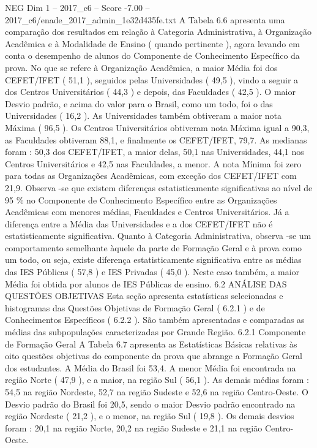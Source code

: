 \begin{textsample}{NEG Dim 1 – 2017\_c6 – Score -7.00 – 2017\_c6/enade\_2017\_admin\_1e32d435fe.txt}
A Tabela 6.6 apresenta uma comparação dos resultados em relação à Categoria Administrativa, à Organização Acadêmica e à Modalidade de Ensino ( quando pertinente ), agora levando em conta o desempenho de alunos do Componente de Conhecimento Específico da prova.
No que se refere à Organização Acadêmica, a maior Média foi dos CEFET/IFET ( 51,1 ), seguidos pelas Universidades ( 49,5 ), vindo a seguir a dos Centros Universitários ( 44,3 ) e depois, das Faculdades ( 42,5 ).
O maior Desvio padrão, e acima do valor para o Brasil, como um todo, foi o das Universidades ( 16,2 ).
As Universidades também obtiveram a maior nota Máxima ( 96,5 ).
Os Centros Universitários obtiveram nota Máxima igual a 90,3, as Faculdades obtiveram 88,1, e finalmente os CEFET/IFET, 79,7.
As medianas foram : 50,3 dos CEFET/IFET, a maior delas, 50,1 nas Universidades, 44,1 nos Centros Universitários e 42,5 nas Faculdades, a menor.
A nota Mínima foi zero para todas as Organizações Acadêmicas, com exceção dos CEFET/IFET com 21,9.
Observa -se que existem diferenças estatisticamente significativas ao nível de 95 \% no Componente de Conhecimento Específico entre as Organizações Acadêmicas com menores médias, Faculdades e Centros Universitários.
Já a diferença entre a Média das Universidades e a dos CEFET/IFET não é estatisticamente significativa.
Quanto à Categoria Administrativa, observa -se um comportamento semelhante àquele da parte de Formação Geral e à prova como um todo, ou seja, existe diferença estatisticamente significativa entre as médias das IES Públicas ( 57,8 ) e IES Privadas ( 45,0 ).
Neste caso também, a maior Média foi obtida por alunos de IES Públicas de ensino. 6.2 ANÁLISE DAS QUESTÕES OBJETIVAS Esta seção apresenta estatísticas selecionadas e histogramas das Questões Objetivas de Formação Geral ( 6.2.1 ) e de Conhecimentos Específicos ( 6.2.2 ).
São também apresentadas e comparadas as médias das subpopulações caracterizadas por Grande Região. 6.2.1 Componente de Formação Geral A Tabela 6.7 apresenta as Estatísticas Básicas relativas às oito questões objetivas do componente da prova que abrange a Formação Geral dos estudantes.
A Média do Brasil foi 53,4.
A menor Média foi encontrada na região Norte ( 47,9 ), e a maior, na região Sul ( 56,1 ).
As demais médias foram : 54,5 na região Nordeste, 52,7 na região Sudeste e 52,6 na região Centro-Oeste.
O Desvio padrão do Brasil foi 20,5, sendo o maior Desvio padrão encontrado na região Nordeste ( 21,2 ), e o menor, na região Sul ( 19,8 ).
Os demais desvios foram : 20,1 na região Norte, 20,2 na região Sudeste e 21,1 na região Centro-Oeste.

\end{textsample}
